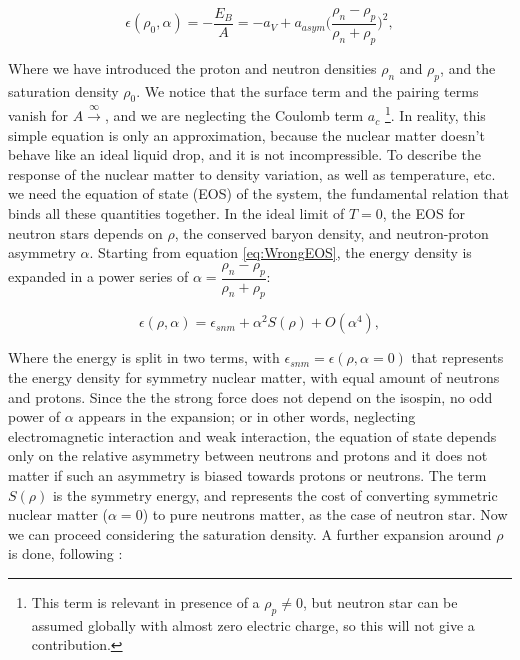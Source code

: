 \begin{equation} \label{eq:WrongEOS}
\epsilon (\rho_{0}, \alpha) = -\frac{E_{B}}{A} = -a_{V} + a_{asym} \bigl(\dfrac{\rho_{n} - \rho_{p}}{\rho_{n} + \rho_{p}} \bigl)^{2} ,
\end{equation}

Where we have introduced the proton and neutron densities $\rho_{n}$ and $\rho_{p}$, and the saturation density $\rho_{0}$. We notice that the surface term and the pairing terms vanish for $A \xrightarrow \infty$, and we are neglecting the Coulomb term $a_{c}$ \footnote{This term is relevant in presence of a $\rho_{p} \neq 0 $, but neutron star can be assumed globally with almost zero electric charge, so this will not give a contribution.}.
In reality, this simple equation is only an approximation, because the nuclear matter doesn't behave like an ideal liquid drop, and it is not incompressible. To describe the response of the nuclear matter to density variation, as well as temperature, etc. we need the equation of state (EOS) of the system, the fundamental relation that binds all these quantities together. In the ideal limit of $T = 0$, the EOS for neutron stars depends on $\rho$, the conserved baryon density, and neutron-proton asymmetry $\alpha$. Starting from equation \ref{eq:WrongEOS}, the energy density is expanded in a power series of $\alpha = \dfrac{\rho_{n} - \rho_{p}}{\rho_{n} + \rho_{p}}$:

\begin{equation}
\epsilon (\rho,\alpha) = \epsilon_{snm} + \alpha ^{2} S(\rho) + O(\alpha ^{4}) ,
\end{equation}

Where the energy is split in two terms, with $\epsilon_{snm} = \epsilon (\rho, \alpha = 0)$ that represents the energy density for symmetry nuclear matter, with equal amount of neutrons and protons. Since the the strong force does not depend on the isospin, no odd power of $\alpha$ appears in the expansion; or in other words, neglecting electromagnetic interaction and weak interaction, the equation of state depends only on the relative asymmetry between neutrons and protons and it does not matter if such an asymmetry is biased towards protons or neutrons. The term $S(\rho)$ is the symmetry energy, and represents the cost of converting symmetric nuclear matter ($\alpha = 0$) to pure neutrons matter, as the case of neutron star. Now we can proceed considering the saturation density. A further expansion around $\rho$ is done, following \cite{Piekarewicz_2009}:
	
